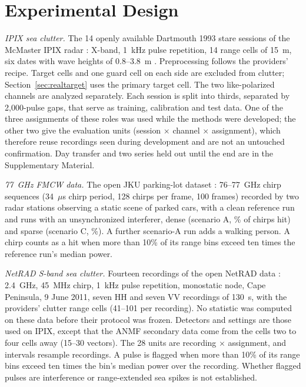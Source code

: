 \documentclass[journal]{IEEEtran}
\begin{document}
\section{Experimental Design}\label{sec:design}
\emph{IPIX sea clutter.} The 14 openly available Dartmouth 1993 stare sessions of the McMaster IPIX radar \cite{ipixweb}: X-band, 1~kHz pulse repetition, 14 range cells of 15~m, six dates with wave heights of 0.8--3.8~m \cite{haykin1995}. Preprocessing follows the providers' recipe. Target cells and one guard cell on each side are excluded from clutter; Section~\ref{sec:realtarget} uses the primary target cell. The two like-polarized channels are analyzed separately. Each session is split into thirds, separated by 2,000-pulse gaps, that serve as training, calibration and test data. One of the three assignments of these roles was used while the methods were developed; the other two give the \NUnitsConf{} evaluation units (session $\times$ channel $\times$ assignment), which therefore reuse recordings seen during development and are not an untouched confirmation. Day transfer and two series held out until the end are in the Supplementary Material.

\emph{77~GHz FMCW data.} The open JKU parking-lot dataset \cite{jku2026}: 76--77~GHz chirp sequences (34~$\mu$s chirp period, 128 chirps per frame, 100 frames) recorded by two radar stations observing a static scene of parked cars, with a clean reference run and runs with an unsynchronized interferer, dense (scenario A, \JHitA\% of chirps hit) and sparse (scenario C, \JHitC\%). A further scenario-A run adds a walking person. A chirp counts as a hit when more than 10\% of its range bins exceed ten times the reference run's median power.

\emph{NetRAD S-band sea clutter.} Fourteen recordings of the open NetRAD data \cite{netrad2026,fioranelli2016netrad}: 2.4~GHz, 45~MHz chirp, 1~kHz pulse repetition, monostatic node, Cape Peninsula, 9 June 2011, seven HH and seven VV recordings of 130~s, with the providers' clutter range cells (41--101 per recording). No statistic was computed on these data before their protocol was frozen. Detectors and settings are those used on IPIX, except that the ANMF secondary data come from the cells two to four cells away (15--30 vectors). The 28 units are recording $\times$ assignment, and intervals resample recordings. A pulse is flagged when more than 10\% of its range bins exceed ten times the bin's median power over the recording. Whether flagged pulses are interference or range-extended sea spikes is not established.
\end{document}
